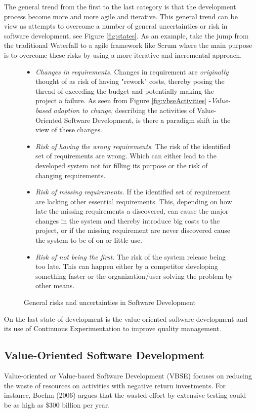 \documentclass{sig-alternate}
\begin{document}
The general trend from the first to the last category is that the development process become more and more agile and iterative. This general trend can be view as attempts to overcome a number of general uncertainties or risk in software development, see Figure \ref{fig:states}.
As an example, take the jump from the traditional Waterfall to a agile framework like Scrum where the main purpose is to overcome these risks by using a more iterative and incremental approach\cite{sutherland:scrum}.
\begin{figure}
\caption{General risks and uncertainties in Software Development}
\begin{itemize}
\item \textit{Changes in requirements.} Changes in requirement are \textit{originally} thought of as risk of having "rework" costs, thereby posing the thread of exceeding the budget and potentially making the project a failure. As seen from Figure \ref{fig:vbseActivities} -\textit{Value-based adoption to change}, describing the activities of Value-Oriented Software Development, is there a paradigm shift in the view of these changes.
\item \textit{Risk of having the wrong requirements.} The risk of the identified set of requirements are wrong. Which can either lead to the developed system not for filling its purpose or the risk of changing requirements.
\item \textit{Risk of missing requirements.} If the identified set of requirement are lacking other essential requirements. This, depending on how late the missing requirements a discovered, can cause the major changes in the system and thereby introduce big costs to the project, or if the missing requirement are never discovered cause the system to be of on or little use.
\item \textit{Risk of not being the first.} The risk of the system release being too late. This can happen either by a competitor developing something faster or the organization/user solving the problem by other means.
\end{itemize}
\label{fig:generalrisks}
\end{figure}

On the last state of development is the value-oriented software development and its use of Continuous Experimentation to improve quality management. 

\subsection{Value-Oriented Software Development}
Value-oriented or Value-based Software Development (VBSE) focuses on reducing the waste of resources on activities with negative return investments. For instance, Boehm (2006) argues that the wasted effort by extensive testing could be as high as \$300 billion per year\cite{stefan:valuebased}.
\end{document}
